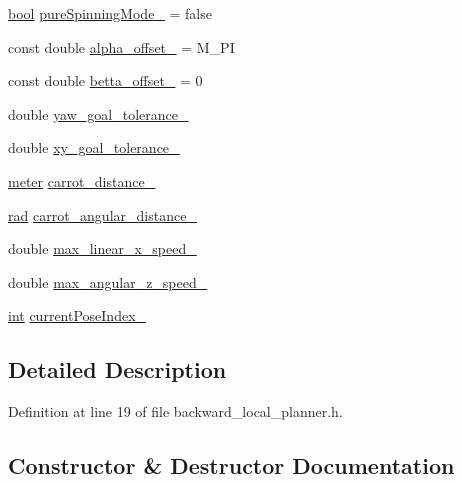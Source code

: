 \begin{DoxyCompactItemize}
\item 
\hyperlink{classbool}{bool} \hyperlink{classbackward__local__planner_1_1BackwardLocalPlanner_a04a769cc9f1ae5170b06c92edfbb80f6}{pure\+Spinning\+Mode\+\_\+} = false
\item 
const double \hyperlink{classbackward__local__planner_1_1BackwardLocalPlanner_a5897f084e4829cb5edd2f1fce5fe2546}{alpha\+\_\+offset\+\_\+} = M\+\_\+\+PI
\item 
const double \hyperlink{classbackward__local__planner_1_1BackwardLocalPlanner_a3eeb4150cba2ff54d177b9a51c6c17cb}{betta\+\_\+offset\+\_\+} = 0
\item 
double \hyperlink{classbackward__local__planner_1_1BackwardLocalPlanner_ad402f445e3358e233e4cbcc31def86c7}{yaw\+\_\+goal\+\_\+tolerance\+\_\+}
\item 
double \hyperlink{classbackward__local__planner_1_1BackwardLocalPlanner_accf76d17d29c3b798fc4ec7841273b7c}{xy\+\_\+goal\+\_\+tolerance\+\_\+}
\item 
\hyperlink{backward__local__planner_8h_ab6024a26b088c11b8a5218a469ae5a57}{meter} \hyperlink{classbackward__local__planner_1_1BackwardLocalPlanner_a969063a163a35ad5c234d03a77528657}{carrot\+\_\+distance\+\_\+}
\item 
\hyperlink{backward__local__planner_8h_a640effbe91ae9b25d698a883a9e80d96}{rad} \hyperlink{classbackward__local__planner_1_1BackwardLocalPlanner_adcfcc43316a79db09f6c09b8e2a482b6}{carrot\+\_\+angular\+\_\+distance\+\_\+}
\item 
double \hyperlink{classbackward__local__planner_1_1BackwardLocalPlanner_a649fccd71e53ae248ee2f51506e381d2}{max\+\_\+linear\+\_\+x\+\_\+speed\+\_\+}
\item 
double \hyperlink{classbackward__local__planner_1_1BackwardLocalPlanner_a737a0163525aae9afb44bd17f9e013ad}{max\+\_\+angular\+\_\+z\+\_\+speed\+\_\+}
\item 
\hyperlink{classint}{int} \hyperlink{classbackward__local__planner_1_1BackwardLocalPlanner_af2485562720c0ce3c895debdbdfc89f3}{current\+Pose\+Index\+\_\+}
\end{DoxyCompactItemize}


\subsection{Detailed Description}


Definition at line 19 of file backward\+\_\+local\+\_\+planner.\+h.



\subsection{Constructor \& Destructor Documentation}
